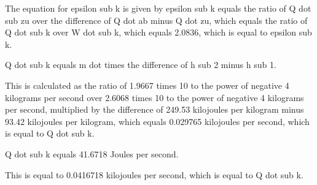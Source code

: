 The equation for epsilon sub k is given by epsilon sub k equals the ratio of Q dot sub zu over the difference of Q dot ab minus Q dot zu, which equals the ratio of Q dot sub k over W dot sub k, which equals 2.0836, which is equal to epsilon sub k.

Q dot sub k equals m dot times the difference of h sub 2 minus h sub 1.

This is calculated as the ratio of 1.9667 times 10 to the power of negative 4 kilograms per second over 2.6068 times 10 to the power of negative 4 kilograms per second, multiplied by the difference of 249.53 kilojoules per kilogram minus 93.42 kilojoules per kilogram, which equals 0.029765 kilojoules per second, which is equal to Q dot sub k.

Q dot sub k equals 41.6718 Joules per second.

This is equal to 0.0416718 kilojoules per second, which is equal to Q dot sub k.